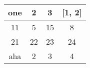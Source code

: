 \documentclass[12pt]{article}
\begin{document}
\begin{tabular}{|c|c|c|c|}
\hline
one & 2 & 3 & [1, 2] \\
\hline
11 & 5 & 15 & 8 \\
\hline
21 & 22 & 23 & 24 \\
\hline
aha & 2 & 3 & 4 \\
\hline
\end{tabular}
\end{document}
